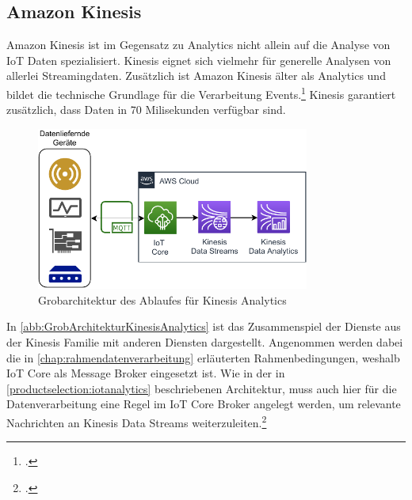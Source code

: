 \subsection{Amazon Kinesis}
Amazon Kinesis ist im Gegensatz zu \AWSIOT Analytics nicht allein auf die Analyse von \ac{IoT} Daten spezialisiert. Kinesis eignet sich vielmehr für generelle Analysen von allerlei Streamingdaten. Zusätzlich ist Amazon Kinesis älter als \AWSIOT Analytics und bildet die technische Grundlage für die Verarbeitung \AWSIOT Events.\footcite[Vgl.][]{Pogosova.28.05.2020} Kinesis garantiert zusätzlich, dass Daten in 70 Milisekunden verfügbar sind.

\begin{figure}[H]
\centering
\includegraphics[width=0.8\textwidth]{graphics/Kinesis-Analytics-general.pdf}
\caption{Grobarchitektur des Ablaufes für Kinesis Analytics}
\label{abb:GrobArchitekturKinesisAnalytics}
\end{figure}
In \autoref{abb:GrobArchitekturKinesisAnalytics} ist das Zusammenspiel der Dienste aus der Kinesis Familie mit anderen Diensten dargestellt. Angenommen werden dabei die in \autoref{chap:rahmendatenverarbeitung} erläuterten Rahmenbedingungen, weshalb \ac{IoT} Core als Message Broker eingesetzt ist. Wie in der in \autoref{productselection:iotanalytics} beschriebenen Architektur, muss auch hier für die Datenverarbeitung eine Regel im \ac{IoT} Core Broker angelegt werden, um relevante Nachrichten an Kinesis Data Streams weiterzuleiten.\footcite[Vgl.][]{AmazonWebServicesInc..o.J.}

